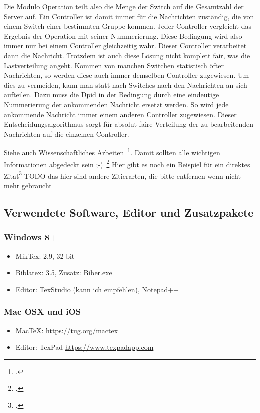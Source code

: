 Die Modulo Operation teilt also die Menge der Switch auf die Gesamtzahl der Server auf. Ein Controller ist damit immer für die Nachrichten zuständig, die von einem Switch einer bestimmten Gruppe kommen. 
Jeder Controller vergleicht das Ergebnis der Operation mit seiner Nummerierung. Diese Bedingung wird also immer nur bei einem Controller gleichzeitig wahr. Dieser Controller verarbeitet dann die Nachricht. 
Trotzdem ist auch diese Lösung nicht komplett fair, was die Lastverteilung angeht. Kommen von manchen Switchen statistisch öfter Nachrichten, so werden diese auch immer demselben Controller zugewiesen. Um dies zu vermeiden, 
kann man statt nach Switches nach den Nachrichten an sich aufteilen. Dazu muss die Dpid in der Bedingung durch eine eindeutige Nummerierung der ankommenden Nachricht ersetzt werden. 
So wird jede ankommende Nachricht immer einem anderen Controller zugewiesen. Dieser Entscheidungsalgorithmus sorgt für absolut faire Verteilung der zu bearbeitenden Nachrichten auf die einzelnen Controller.






Siehe auch Wissenschaftliches Arbeiten~\footcite[\vglf][S. 1]{Balzert.2008}. %
Damit sollten alle wichtigen Informationen abgedeckt sein ;-)~\footcite[\vglf][]{Balzert.2008} %
Hier gibt es noch ein Beispiel für ein direktes Zitat\footcite[][]{Balzert.2008} %
TODO das hier sind andere Zitierarten, die bitte entfernen wenn nicht mehr gebraucht






\subsection{Verwendete Software, Editor und Zusatzpakete}
\subsubsection{Windows 8+}
\begin{itemize}
\item MikTex: 2.9, 32-bit
\item Biblatex: 3.5, Zusatz: Biber.exe
\item Editor: TexStudio (kann ich empfehlen), Notepad++
\end{itemize}

\subsubsection{Mac OSX und iOS}
\begin{itemize}
\item MacTeX: \url{https://tug.org/mactex}
\item Editor: TexPad \url{https://www.texpadapp.com}
\end{itemize}

